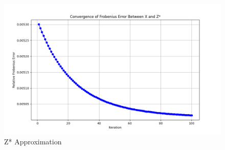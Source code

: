 \documentclass[11pt]{article}
\begin{document}
\begin{figure}[htbp]
	\centering
	\includegraphics[width=\textwidth]{figures/hw3_3.png}
	\caption{Z* Approximation}
\label{fig:objective_func_scores}
\end{figure}
\end{document}
